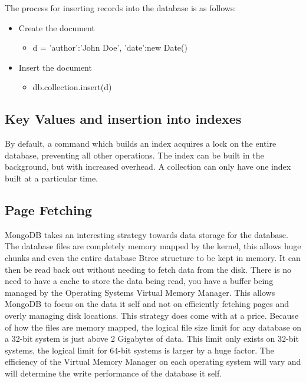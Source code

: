\documentclass{dependencies/acm_proc_article-sp}
\begin{document}
The process for inserting records into the database is as follows:
\begin{itemize}
  \item Create the document
  \begin{itemize}
    \item d = {'author':'John Doe', 'date':new Date() }
  \end{itemize}

  \item Insert the document
  \begin{itemize}
    \item db.collection.insert(d)
  \end{itemize}
\end{itemize}

\subsection{Key Values and insertion into indexes}
By default, a command which builds an index acquires a lock on the entire database,
preventing all other operations. The index can be built in the background,
but with increased overhead.
A collection can only have one index built at a particular time\cite{7}.
\subsection{Page Fetching}
MongoDB takes an interesting strategy towards data storage for the database.
The database files are completely memory mapped by the kernel, this allows huge chunks and
even the entire database Btree structure to be kept in memory.
It can then be read back out without needing to fetch data from the disk. \cite{16}
There is no need to have a cache to store the data being read, you have a buffer being managed
by the Operating Systems Virtual Memory Manager. This allows MongoDB to focus on the data it self
and not on efficiently fetching pages and overly managing disk locations. This strategy does come with
at a price. Because of how the files are memory mapped, the logical file size limit for any database
on a 32-bit system is just above 2 Gigabytes of data. This limit only exists on 32-bit systems, the
logical limit for 64-bit systems is larger by a huge factor. The efficiency of the
Virtual Memory Manager on each operating system will vary and will determine the write performance
of the database it self.
\end{document}
